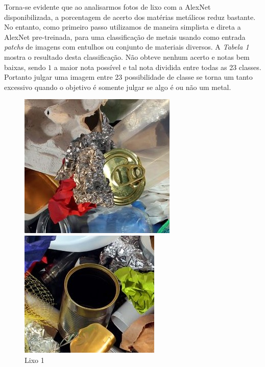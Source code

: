\documentclass[conference, compsoc, 12pt]{IEEEtran}
\begin{document}
Torna-se evidente que ao analisarmos fotos de lixo com a AlexNet disponibilizada, a porcentagem de acerto dos matérias metálicos
reduz bastante. No entanto, como primeiro passo utilizamos de maneira simplista e direta a AlexNet pre-treinada,
para uma classificação de metais usando como entrada \emph{patchs}
de imagens com entulhos ou conjunto de materiais diversos. A \emph{Tabela 1}
mostra o resultado desta classificação. Não obteve nenhum acerto e notas bem baixas,
sendo $1$ a maior nota possível e tal nota dividida entre todas as 23 classes.
Portanto julgar uma imagem entre 23 possibilidade de classe se torna um tanto excessivo
quando o objetivo é somente julgar se algo é ou não um metal.

\begin{figure}[ht]
  \label{fig1}
  \begin{minipage}[b]{0.5\linewidth}
    \centering
    \includegraphics[width=.8\linewidth]{lixo1.jpg}
    \caption{Lixo 1}
    \vspace{4ex}
  \end{minipage}%
  \begin{minipage}[b]{0.5\linewidth}
    \centering
    \includegraphics[width=.8\linewidth]{lixo2.jpg}

\end{minipage}
\end{figure}
\end{document}
